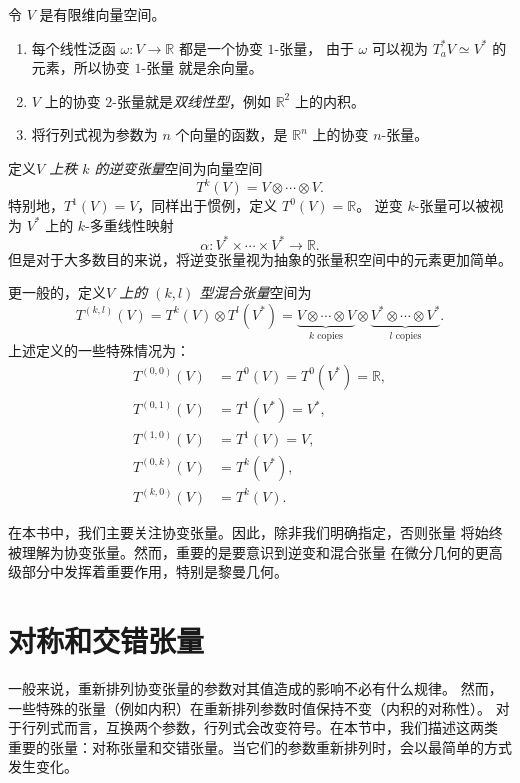 \begin{example}[协变张量]
  令 $V$ 是有限维向量空间。
  \begin{enumerate}
    \item 每个线性泛函 $\omega:V\to \mathbb{R}$ 都是一个协变 $1$-张量，
    由于 $\omega$ 可以视为 $T_a^*V\simeq V^*$ 的元素，所以协变 $1$-张量
    就是余向量。
    \item $V$ 上的协变 $2$-张量就是\emph{双线性型}，例如 $\mathbb{R}^2$
    上的内积。
    \item 将行列式视为参数为 $n$ 个向量的函数，是 $\mathbb{R}^n$ 上的协变 $n$-张量。
  \end{enumerate}
\end{example}

定义\emph{$V$ 上秩 $k$ 的逆变张量}空间为向量空间
\[
  T^k(V)=V\otimes \cdots\otimes V.  
\]
特别地，$T^1(V)=V$，同样出于惯例，定义 $T^0(V)=\mathbb{R}$。
逆变 $k$-张量可以被视为 $V^*$ 上的 $k$-多重线性映射
\[
  \alpha:V^*\times \cdots\times V^*\to \mathbb{R} . 
\]
但是对于大多数目的来说，将逆变张量视为抽象的张量积空间中的元素更加简单。

更一般的，定义\emph{$V$ 上的 $(k,l)$ 型混合张量}空间为
\[
  T^{(k,l)}(V)=T^k(V)\otimes T^l(V^*)=\underbrace{V\otimes\cdots\otimes V}_{\text{$k$ copies}}  
  \otimes \underbrace{V^*\otimes\cdots\otimes V^*}_{\text{$l$ copies}}.
\]
上述定义的一些特殊情况为：
\begin{align*}
  T^{(0,0)}(V)&=T^0(V)=T^0(V^*)=\mathbb{R},\\
  T^{(0,1)}(V)&=T^1(V^*)=V^*,\\
  T^{(1,0)}(V)&=T^1(V)=V,\\
  T^{(0,k)}(V)&=T^k(V^*),\\
  T^{(k,0)}(V)&=T^k(V).
\end{align*}

在本书中，我们主要关注协变张量。因此，除非我们明确指定，否则张量
将始终被理解为协变张量。然而，重要的是要意识到逆变和混合张量
在微分几何的更高级部分中发挥着重要作用，特别是黎曼几何。

\section{对称和交错张量}

一般来说，重新排列协变张量的参数对其值造成的影响不必有什么规律。
然而，一些特殊的张量（例如内积）在重新排列参数时值保持不变（内积的对称性）。
对于行列式而言，互换两个参数，行列式会改变符号。在本节中，我们描述这两类
重要的张量：对称张量和交错张量。当它们的参数重新排列时，会以最简单的方式发生变化。

